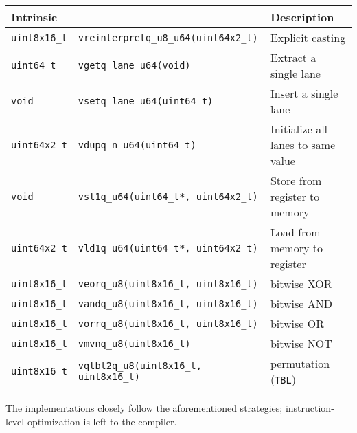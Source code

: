 \begin{table}[h!]
    \centering
    \footnotesize
    \begin{tabularx}{\textwidth}{ll|X}
        Intrinsic && Description \\
        \hline
        \texttt{uint8x16\_t} & \texttt{vreinterpretq\_u8\_u64(uint64x2\_t)} & Explicit casting \\
        \hline
        \texttt{uint64\_t} & \texttt{vgetq\_lane\_u64(void)} & Extract a single lane \\
        \hline
        \texttt{void} & \texttt{vsetq\_lane\_u64(uint64\_t)} & Insert a single lane \\
        \hline
        \texttt{uint64x2\_t} & \texttt{vdupq\_n\_u64(uint64\_t)} & Initialize all lanes to same value \\
        \hline
        \texttt{void} & \texttt{vst1q\_u64(uint64\_t*, uint64x2\_t)} & Store from register to memory \\
        \hline
        \texttt{uint64x2\_t} & \texttt{vld1q\_u64(uint64\_t*, uint64x2\_t)} & Load from memory to register \\
        \hline
        \texttt{uint8x16\_t} & \texttt{veorq\_u8(uint8x16\_t, uint8x16\_t)} & bitwise XOR \\
        \hline
        \texttt{uint8x16\_t} & \texttt{vandq\_u8(uint8x16\_t, uint8x16\_t)} & bitwise AND \\
        \hline
        \texttt{uint8x16\_t} & \texttt{vorrq\_u8(uint8x16\_t, uint8x16\_t)} & bitwise OR \\
        \hline
        \texttt{uint8x16\_t} & \texttt{vmvnq\_u8(uint8x16\_t)} & bitwise NOT \\
        \hline
        \texttt{uint8x16\_t} & \texttt{vqtbl2q\_u8(uint8x16\_t, uint8x16\_t)} & permutation (\texttt{TBL}) \\
    \end{tabularx}
\end{table}

The implementations closely follow the aforementioned strategies;
instruction-level optimization is left to the compiler.
